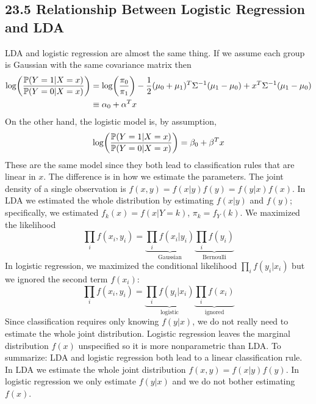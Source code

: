 \subsection*{23.5 Relationship Between Logistic Regression and LDA}\label{relationship-between-logistic-regression-and-lda}
LDA and logistic regression are almost the same thing.
If we assume each group is Gaussian with the same covariance matrix then
\begin{align*}
\log \left( \frac{\PROB(Y = 1 | X = x)}{\PROB(Y = 0 | X = x)} \right) 
&= \log \left( \frac{\pi_{0}}{\pi_{1}} \right) - \frac{1}{2} (\mu_{0} + \mu_{1})^T \Sigma^{-1} (\mu_{1} - \mu_{0}) + x^T \Sigma^{-1}( \mu_{1} - \mu_{0}) \\
&\equiv \alpha_{0} + \alpha^T x
\end{align*}
On the other hand, the logistic model is, by assumption,
\[
\log \left( \frac{\PROB(Y = 1 | X = x)}{\PROB(Y = 0 | X = x)} \right) = \beta_{0} + \beta^T x
\]
These are the same model since they both lead to classification rules
that are linear in \(x\). The difference is in how we estimate the
parameters.
The joint density of a single observation is
\(f(x, y) = f(x | y) f(y) = f(y | x) f(x)\). In LDA we estimated the
whole distribution by estimating \(f(x | y)\) and \(f(y)\);
specifically, we estimated \(f_{k}(x) = f(x | Y = k)\),
\(\pi_{k} = f_Y(k)\). We maximized the likelihood
\[
\prod_{i} f(x_{i}, y_{i}) = \underbrace{\prod_{i} f(x_{i} | y_{i})}_\text{Gaussian} \underbrace{ \prod_{i} f(y_{i}) }_\text{Bernoulli}
\]
In logistic regression, we maximized the conditional likelihood
\(\prod_{i} f(y_{i} | x_{i})\) but we ignored the second term \(f(x_{i})\):
\[
\prod_{i} f(x_{i}, y_{i}) = \underbrace{\prod_{i} f(y_{i} | x_{i})}_\text{logistic} \underbrace{ \prod_{i} f(x_{i}) }_\text{ignored}
\]
Since classification requires only knowing \(f(y | x)\), we do not really
need to estimate the whole joint distribution. Logistic regression
leaves the marginal distribution \(f(x)\) unspecified so it is more
nonparametric than LDA.
To summarize: LDA and logistic regression both lead to a linear
classification rule. In LDA we estimate the whole joint distribution
\(f(x, y) = f(x | y) f(y)\). In logistic regression we only estimate
\(f(y | x)\) and we do not bother estimating \(f(x)\).

